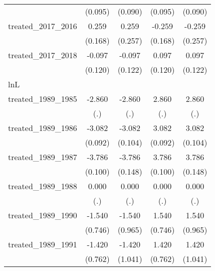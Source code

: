 {\begin{tabular}{l*{4}{c}}
            &     (0.095)         &     (0.090)         &     (0.095)         &     (0.090)         \\
[1em]
treated\_2017\_2016&       0.259         &       0.259         &      -0.259         &      -0.259         \\
            &     (0.168)         &     (0.257)         &     (0.168)         &     (0.257)         \\
[1em]
treated\_2017\_2018&      -0.097         &      -0.097         &       0.097         &       0.097         \\
            &     (0.120)         &     (0.122)         &     (0.120)         &     (0.122)         \\
\hline
lnL         &                     &                     &                     &                     \\
treated\_1989\_1985&      -2.860         &      -2.860         &       2.860         &       2.860         \\
            &         (.)         &         (.)         &         (.)         &         (.)         \\
[1em]
treated\_1989\_1986&      -3.082\sym{***}&      -3.082\sym{***}&       3.082\sym{***}&       3.082\sym{***}\\
            &     (0.092)         &     (0.104)         &     (0.092)         &     (0.104)         \\
[1em]
treated\_1989\_1987&      -3.786\sym{***}&      -3.786\sym{***}&       3.786\sym{***}&       3.786\sym{***}\\
            &     (0.100)         &     (0.148)         &     (0.100)         &     (0.148)         \\
[1em]
treated\_1989\_1988&       0.000         &       0.000         &       0.000         &       0.000         \\
            &         (.)         &         (.)         &         (.)         &         (.)         \\
[1em]
treated\_1989\_1990&      -1.540\sym{*}  &      -1.540         &       1.540\sym{*}  &       1.540         \\
            &     (0.746)         &     (0.965)         &     (0.746)         &     (0.965)         \\
[1em]
treated\_1989\_1991&      -1.420         &      -1.420         &       1.420         &       1.420         \\
            &     (0.762)         &     (1.041)         &     (0.762)         &     (1.041)         \\

\end{tabular}}
